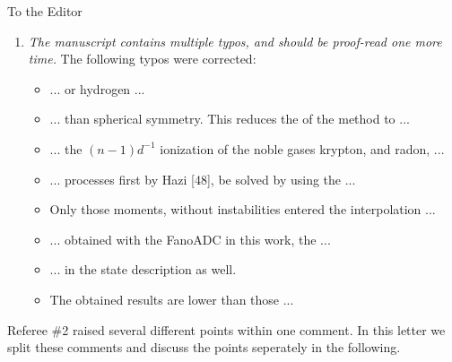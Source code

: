 \documentclass[DIN,pagenumber=false,parskip=half,fromalign=left,fromphone=true,fromemail=true,fromurl=false,fromlogo=false,fromrule=false]{scrlttr2}
\begin{document}
\begin{letter}{To the Editor}
\begin{enumerate}
       Unfortunately the procedure to obtain the optimal abscissae and weights
       involves the subtraction of two large numbers, which
       leads to numerical instabilities in high order moments. Therefore, they have to
       be checked carefully and only trustworthy moments should be
       used for the evaluation of the decay widths.
       {\color{blue}{This can be achieved by inspection of abscissae and weights
       of each order.
       Since the decay width $\Gamma(E)$ is a smooth function
       unphysical oscillations in the curve constructed
       from the abscissae and weights of one order of moments indicate numerical
       instabilities in this particular order.
       If this behaviour is observed, the abscissae and weights obtained from this
       order of moments and all higher orders are discarded.
       Finally, the abscissae
       and weights from the remaining, consecutive orders of moments enter
       the interpolation scheme.}}
 \item \emph{The manuscript contains multiple typos, and should be proof-read
             one more time.}
   The following typos were corrected:
   \begin{itemize}
    \item ... or hydrogen {\color{blue}{fluoride}} ...
    \item ... than spherical symmetry. This reduces the {\color{blue}{applicability}}
          of the method to ...
    \item ... the $(n-1)d^{-1}$ ionization of the noble gases krypton,
          {\color{blue}{xenon}} and radon, ...
    \item ... processes first {\color{blue}{proposed}} by Hazi [48],
          be solved by using the ...
    \item Only those moments, without {\color{blue}{numerical}} instabilities
          entered the interpolation ...
    \item ... obtained with the {\color{blue}{relativistic}} FanoADC in this work,
          the {\color{blue}{MMCDF}} ...
    \item ... in the {\color{blue}{initial}} state description as well.
    \item The {\color{blue}{non-relativistically}} obtained results are
          lower than those ...
   \end{itemize}
\end{enumerate}

Referee \#2 raised several different points within one comment. In this letter
we split these comments and discuss the points seperately in the following. 


\end{letter}
\end{document}
